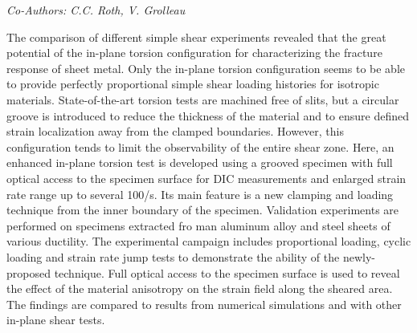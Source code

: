 \begin{center}
\textit{Co-Authors: C.C. Roth, V. Grolleau}
\end{center} 
The comparison of different simple shear experiments revealed that the great potential of the in-plane torsion configuration for characterizing the fracture response of sheet metal. Only the in-plane torsion configuration seems to be able to provide perfectly proportional simple shear loading histories for isotropic materials. State-of-the-art torsion tests are machined free of slits, but a circular groove is introduced to reduce the thickness of the material and to ensure defined strain localization away from the clamped boundaries. However, this configuration tends to limit the observability of the entire shear zone. Here, an enhanced in-plane torsion test is developed using a grooved specimen with full optical access to the specimen surface for DIC measurements and enlarged strain rate range up to several 100/s. Its main feature is a new clamping and loading technique from the inner boundary of the specimen. Validation experiments are performed on specimens extracted fro man aluminum alloy and steel sheets of various ductility. The experimental campaign includes proportional loading, cyclic loading and strain rate jump tests to demonstrate the ability of the newly-proposed technique. Full optical access to the specimen surface is used to reveal the effect of the material anisotropy on the strain field along the sheared area. The findings are compared to results from numerical simulations and with other in-plane shear tests.
